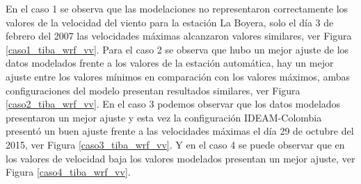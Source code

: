 En el caso 1 se observa que las modelaciones no representaron correctamente los valores de la velocidad del viento para la estación La Boyera, solo el día 3 de febrero del 2007 las velocidades máximas alcanzaron valores similares, ver Figura \ref{caso1_tiba_wrf_vv}. Para el caso 2 se observa que hubo un mejor ajuste de los datos modelados frente a los valores de la estación automática, hay un mejor ajuste entre los valores mínimos en comparación con los valores máximos, ambas configuraciones del modelo presentan resultados similares, ver Figura \ref{caso2_tiba_wrf_vv}. En el caso 3 podemos observar que los datos modelados presentaron un mejor ajuste y esta vez la configuración IDEAM-Colombia presentó un buen ajuste frente a las velocidades máximas el día 29 de octubre del 2015, ver Figura \ref{caso3_tiba_wrf_vv}. Y en el caso 4 se puede observar que en los valores de velocidad baja los valores modelados presentan un mejor ajuste, ver Figura \ref{caso4_tiba_wrf_vv}.\\


